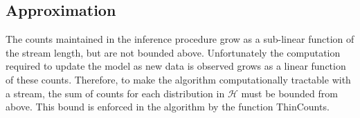 \subsection{Approximation}

The counts maintained in the inference procedure grow as a sub-linear function of the stream length, but are not bounded above.  Unfortunately the computation required to update the model as new data is observed grows as a linear function of these counts.  Therefore, to make the algorithm computationally tractable with a  stream, the sum of counts for each distribution in $\mathcal{H}$ must be bounded from above.  This bound is enforced in the algorithm by the function ThinCounts.